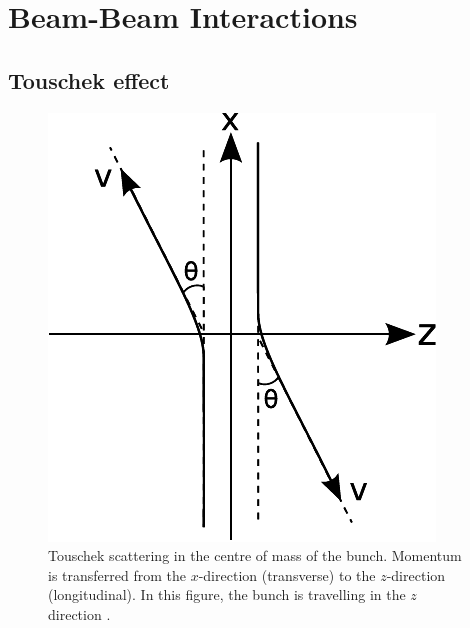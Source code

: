 \section{Beam-Beam Interactions}

\subsection{Touschek effect}

\begin{figure}[htb]
	\centerfloat
		\includegraphics[scale=0.8]{images/TouschekScatter}
	\caption[Touschek scattering in the centre of mass of the bunch]{Touschek scattering in the centre of mass of the bunch. Momentum is transferred from the $x$-direction (transverse) to the $z$-direction (longitudinal). In this figure, the bunch is travelling in the $z$ direction \cite{Wolski}.}
	\label{fig:TousScat}
\end{figure}

